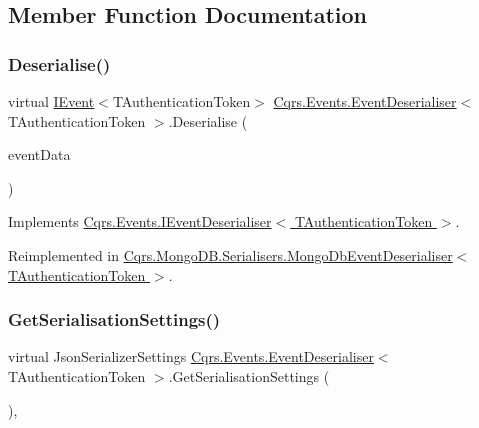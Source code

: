 \subsection{Member Function Documentation}
\mbox{\label{classCqrs_1_1Events_1_1EventDeserialiser_a193feac1d58446f0a7447d8ba04179fc}} 
\subsubsection{\texorpdfstring{Deserialise()}{Deserialise()}}
{\footnotesize\ttfamily virtual \hyperlink{interfaceCqrs_1_1Events_1_1IEvent}{I\+Event}$<$T\+Authentication\+Token$>$ \hyperlink{classCqrs_1_1Events_1_1EventDeserialiser}{Cqrs.\+Events.\+Event\+Deserialiser}$<$ T\+Authentication\+Token $>$.Deserialise (\begin{DoxyParamCaption}\item[{\hyperlink{classCqrs_1_1Events_1_1EventData}{Event\+Data}}]{event\+Data }\end{DoxyParamCaption})\hspace{0.3cm}{\ttfamily [virtual]}}



Implements \hyperlink{interfaceCqrs_1_1Events_1_1IEventDeserialiser_af9216046631ed941bb96b58a0cc27f22}{Cqrs.\+Events.\+I\+Event\+Deserialiser$<$ T\+Authentication\+Token $>$}.



Reimplemented in \hyperlink{classCqrs_1_1MongoDB_1_1Serialisers_1_1MongoDbEventDeserialiser_a2ea63367d97bf66e3dffcabb8c53005e}{Cqrs.\+Mongo\+D\+B.\+Serialisers.\+Mongo\+Db\+Event\+Deserialiser$<$ T\+Authentication\+Token $>$}.

\mbox{\label{classCqrs_1_1Events_1_1EventDeserialiser_a3f767a1b793ea47bcafd9c64be47619e}} 
\subsubsection{\texorpdfstring{Get\+Serialisation\+Settings()}{GetSerialisationSettings()}}
{\footnotesize\ttfamily virtual Json\+Serializer\+Settings \hyperlink{classCqrs_1_1Events_1_1EventDeserialiser}{Cqrs.\+Events.\+Event\+Deserialiser}$<$ T\+Authentication\+Token $>$.Get\+Serialisation\+Settings (\begin{DoxyParamCaption}{ }\end{DoxyParamCaption})\hspace{0.3cm}{\ttfamily [protected]}, {\ttfamily [virtual]}}



